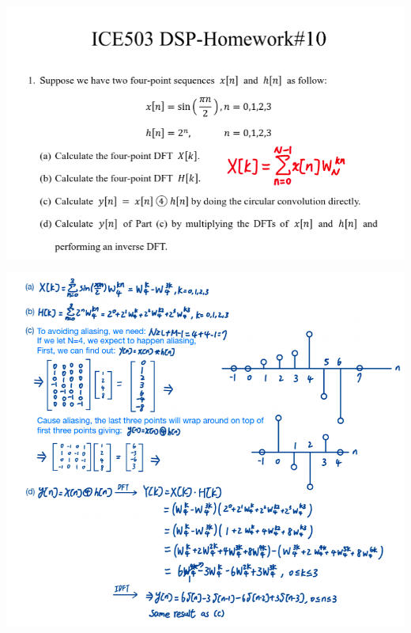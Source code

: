 \documentclass[a4paper]{article}
\begin{document}
\newpage


\begin{center}
	\includegraphics[width=1\linewidth]{screenshot098}
\end{center}

	
\begin{center}
	\includegraphics[width=1\linewidth]{screenshot099}
\end{center}
\end{document}
